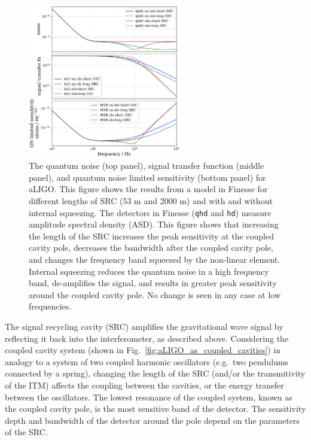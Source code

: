\documentclass[aps,pra,superscriptaddress,reprint,nofootinbib]{revtex4-1}
\newcommand{\code}[1]{\texttt{#1}}
\begin{document}
\begin{figure}
	\begin{center}
	\includegraphics[width=0.6\textwidth]{figures/aLIGO_transfer_fns_and_sensitivity_comparison.pdf}
	\end{center}
	\caption{The quantum noise (top panel), signal transfer function (middle panel), and quantum noise limited sensitivity (bottom panel) for aLIGO. This figure shows the results from a model in Finesse for different lengths of SRC (53 m and 2000 m) and with and without internal squeezing. The detectors in Finesse (\code{qhd} and \code{hd}) measure amplitude spectral density (ASD). This figure shows that increasing the length of the SRC increases the peak sensitivity at the coupled cavity pole, decreases the bandwidth after the coupled cavity pole, and changes the frequency band squeezed by the non-linear element. Internal squeezing reduces the quantum noise in a high frequency band, de-amplifies the signal, and results in greater peak sensitivity around the coupled cavity pole. No change is seen in any case at low frequencies.}
	\label{fig:src_transfer_functions}
\end{figure}

The signal recycling cavity (SRC) amplifies the gravitational wave signal by reflecting it back into the interferometer, as described above.
Considering the coupled cavity system (shown in Fig.~\ref{fig:aLIGO_as_coupled_cavities}) in analogy to a system of two coupled harmonic oscillators (e.g.\ two pendulums connected by a spring), changing the length of the SRC (and/or the transmitivity of the ITM) affects the coupling between the cavities, or the energy transfer between the oscillators. The lowest resonance of the coupled system, known as the coupled cavity pole, is the most sensitive band of the detector. The sensitivity depth and bandwidth of the detector around the pole depend on the parameters of the SRC.
\end{document}

